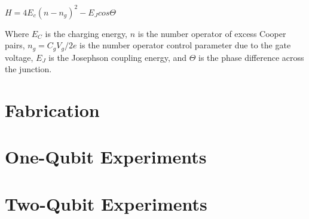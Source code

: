 \documentclass[12pt,letterpaper,notitlepage]{report}
\begin{document}
$H=4E_c(n-n_g)^2-E_Jcos\Theta$

Where $E_C$ is the charging energy, $n$ is the number operator of excess Cooper pairs, $n_g=C_gV_g/2e$ is the number operator control parameter due to the gate voltage, $E_J$ is the Josephson coupling energy, and $\Theta$ is the phase difference across the junction.

%
%

\section*{Fabrication}

%
%

\section*{One-Qubit Experiments}



%
%

\section*{Two-Qubit Experiments}



\end{document}
